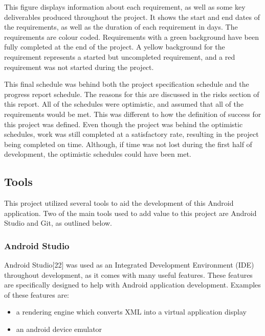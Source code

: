 \documentclass{article}
\begin{document}
This figure displays information about each requirement, as well as some key deliverables produced throughout the project. It shows the start and end dates of the requirements, as well as the duration of each requirement in days. The requirements are colour coded. Requirements with a green background have been fully completed at the end of the project. A yellow background for the requirement represents a started but uncompleted requirement, and a red requirement was not started during the project. \par

This final schedule was behind both the project specification schedule and the progress report schedule. The reasons for this are discussed in the risks section of this report. All of the schedules were optimistic, and assumed that all of the requirements would be met. This was different to how the definition of success for this project was defined. Even though the project was behind the optimistic schedules, work was still completed at a satisfactory rate, resulting in the project being completed on time. Although, if time was not lost during the first half of development, the optimistic schedules could have been met. \par

\subsection{Tools}

This project utilized several tools to aid the development of this Android application. Two of the main tools used to add value to this project are Android Studio and Git, as outlined below.

\subsubsection{Android Studio}

Android Studio[22] was used as an Integrated Development Environment (IDE) throughout development, as it comes with many useful features. These features are specifically designed to help with Android application development. Examples of these features are: 

\begin{itemize}
	\item a rendering engine which converts XML into a virtual application display
	\item an android device emulator
\end{itemize}
\end{document}
